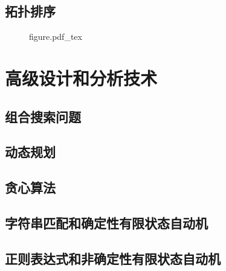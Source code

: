 \documentclass[oneside,10pt,fontset=none]{ctexbook}
\numberwithin{definition}{chapter}
\numberwithin{theorem}{chapter}
\numberwithin{lemma}{chapter}
\begin{document}
\chapter{拓扑排序}

\begin{figure}[htbp]
    \def\svgwidth{\columnwidth}
    {figure.pdf_tex}
\end{figure}

\part{高级设计和分析技术}

\chapter{组合搜索问题}

\chapter{动态规划}

\chapter{贪心算法}

\chapter{字符串匹配和确定性有限状态自动机}

\chapter{正则表达式和非确定性有限状态自动机}
\end{document}
